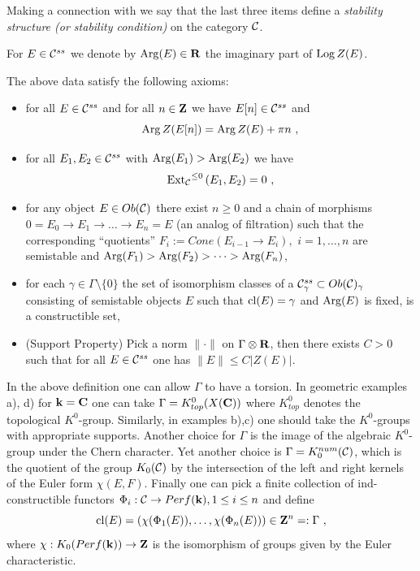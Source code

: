 \documentclass[12pt]{article}
\begin{document}
Making a connection with \cite{Br1} we say that the last three items define a {\it stability structure (or stability condition)} on the category ${\cal C}$.




For $E\in {\mathcal C}^{ss}$ we denote by $\operatorname{Arg}(E)\in {\bf R}$ the imaginary part of $\operatorname{Log} Z(E)$.

 The above data satisfy the following axioms:
 \begin{itemize}
 \item{for all $E\in  {\mathcal C}^{ss}$ and for all $ n\in {\bf Z}$ we have $E[n]\in {\mathcal C}^{ss} $ and
$$\operatorname{Arg} Z(E[n])=\operatorname{Arg} Z (E)+\pi  n\,\,, $$}
 \item{ for all $E_1,E_2\in {\mathcal C}^{ss}$ with $\operatorname{Arg}(E_1)> \operatorname{Arg} (E_2)$ we have $${\operatorname{Ext}_{\cal
C}}^{\le 0}\,(E_1,E_2)=0\,\,,$$}
 \item{ for any object $E\in Ob({\mathcal C})$ there exist $n\geqslant 0$ and a chain of morphisms
  $0=E_0\to E_1 \to \dots \to E_n=E$ (an analog of  filtration)
  such that the corresponding ``quotients'' $F_i:=Cone( E_{i-1}\to E_{i}),\,\,i=1,\dots,n$ are semistable and
   $\operatorname{Arg}(F_1)>\operatorname{Arg}(F_2)> \dots > \operatorname{Arg}(F_{n})$,}
   \item{for each $\gamma \in \Gamma\setminus \{0\}$ the set of isomorphism classes of a
${\mathcal C}^{ss}_\gamma\subset Ob({\cal C})_{\gamma}$ consisting of semistable objects $E$ such that
   $\operatorname{cl}(E)=\gamma$ and $\operatorname{Arg}(E)$ is fixed, is a constructible set,}
   \item{(Support Property) Pick a norm $\parallel\cdot \parallel $ on $\Gamma \otimes
{\bf R}$, then there exists $C>0 $ such that
    for all $E\in {\mathcal C}^{ss}$ one has
   $ \parallel E \parallel\le C|Z(E)|$.}
 \end{itemize}

In the above definition one can allow $\Gamma$ to have a torsion.
 In geometric examples
a), d) for ${\bf k}={\bf C}$ one can take $\Gamma=K^0_{top}(X({\bf C}))$
 where $K^0_{top}$ denotes the topological $K^0$-group. Similarly, in examples b),c)
  one should take the $K^0$-groups with appropriate supports.
 Another choice for $\Gamma$ is the image of the algebraic $K^0$-group under the Chern
character. Yet another
 choice is $\Gamma=K_0^{num}({\mathcal C})$, which is the quotient of the group $K_0({\mathcal C})$ by the
intersection of the left and right kernels of the Euler form $\chi(E,F)$. Finally one can pick a finite collection of ind-constructible functors $\Phi_i: {\mathcal C}\to Perf({\bf k}), 1\le i\le n$ and define
$$\operatorname{cl}(E)=(\chi(\Phi_1(E)),\dots,\chi(\Phi_n(E)))\in {\bf Z}^n=:\Gamma\,\,,$$ where $\chi:K_0(Perf({\bf k}))\to {\bf Z}$ is the isomorphism of groups given by the Euler characteristic.
\end{document}

